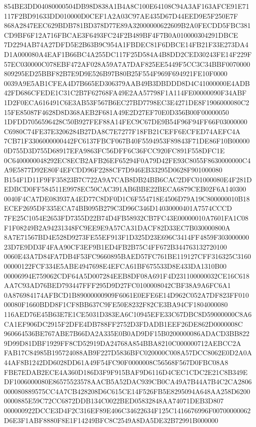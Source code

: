 \documentclass[UTF8,fontset=fandol,zihao=-4,a4paper]{ctexart}
\begin{document}
{{854BE3DD04080000504DB98D838A1B4A8C100E64108C94A3AF163AFCE91E71117F2BD91633DD010000D0CEF1A2A03C97AE435D67D44EED9E5F250E7F
868A2847EEC629BDB781BD378D77E89A32000000622609B2A0FECDD5FBC381CD9BF6F12A716FBCAE3F6493FC24F2B489BF4F7B0A010000304291DBCE
7D2294AB74A27DFD5E2B63B9C954A1FBDEC81F6DBCE14FB21F33E273DA4D1A000080A4EAF1B66BC4A255DC117F25D584A4B8DD2CED30243FE14F229F
57EC030000C078EBF472AF028A59A7A7DAF825EE5449F5CC3C34BBF0070000809295ED25BBF82B7E9D9E526B97B80B25F554F969F694921FE10F0000
0039A9E5AB1CFEA4D7B665ED306379AAB49B3DBDDD8D4C41000000E4ADB42FD686CFEDE1C31C2B7F62768FA49E2AA57798F1A114FE00000090F34ABF
1D2F0ECA616491C6E3AB53F567B6EC27BD7798EC3E4271DE8F1906000080C215FE85087F4628D8D368AEB2F681A49E2D27EF70E0D356B00F00000050
1DFDD7056596428C50B927FEF88A14FEC9C67DE9B54F96F94FF66F03000000C6980C74FE37E3206284B27DA8C7E7277F18FB21CEFF6ECFED74AEFC4A
7CB71F3306000000442FC6137FBCF067B40F5594953F89843F71DE86F10B000000D755D3D755D68917EFA9863FC56DFF6C36FCC920FC891F558DFC1E
0C6400000048292EC8ECB2AFB26EF65294F0A79D42FE93C8055F8630000000C4A9E5877D92E80F4EFCDD96F2288CF7D946EB33295D0628F901000080
B154F1D11F9FF35823B7C722A9A7CAB8DB24BB6CAC2DFC01000080E4F281DEDBCD0FF584511E9978EC50CAC391AB6BBE22BECA6879CEB02F6A140300
0040F4CA7DE083937A4ED77C8DF0D1C6F554718E4506D79A19C800000010B18ECEF2695DF335ECA74BB095B279C3D96C346D14030000401A7574CCCD
7FE25C1054E2653FD7355D22B74D4FB58932CB7FC43E00000010A7601FA1C08F1F08249B2A94231348FC9EE9E9A57CA31DACF82D33EC7B030000800A
8A7E71567BD4E528D9273FE55EF913F1D325D23E696C3414FF4859F30300000023D7E9DD3F4FAA90CF3EF9B1ED4FB2B75C4FF672B344763132720100
0060E43A7D84FA7DB4F53FC9660895BAED57FC761BE119127CFF316325C316000000122FCF334E5ABE4947698E4EFCA61BF675533D8E433DA1310B00
00006994E759062CDF64A5D007284EEB8DF08A691F4D231100000032CE16C618AA7C93AD76BED793447FFF295D9D27FC0100008042CBF38A9A6FC6A1
0A876984174AFBCD1B89000000909F6061E0EFE6E14D962C052A7DF823FF01000080F1660BDD8F1CF8BB637C9FE50E8232F82CE3BA94CF1804000080
116AED76E45B63E7E1CE5031D383EA6C10945EFE33C67DBC8D59000000C8A6CA1EF906DC2915F2DFE4DB788FF2752D3FDADB1EEF26DE862D0000008C
960664536BE767ABE7B66DA2A335E0B0AD9DF15B0200000086ADACD3BB8229D99D81DBF1929FF8CD52919DA24768A854BBA8210C000000712AEBCC2A
FAB17C84985B195724088AB9F227D5836BFC020000C008A57DCC8062E0D2A0A44AF8B1242DD6028DD61A49F54FC90F0000008C56568F567D0FBC08A8
FBE7EDAB2ECE4A360D186D3F9F915BAF9D6116D4CEC1CDC2E21C8B349EDF1006000080E86575523578AACB5A52DAC939CB0CA49A7B44A7B4C2CA2806
000080889575CC4A7CB428208D6C615CE14F526FB5E8295094A648AA258D62000000885E59C72CC6872DDB134C0022BED05832848AA74071DEB3D807
000000922DCCE3D4F2C316EF89E406C34622634F125C1416676996F00700000062D6E3F1ABF8880F8E1F14249BFC8C2549A8DA5DE32B72991B000000
}}
\end{document}
